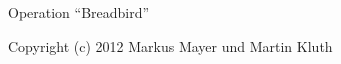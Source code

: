 
\begin{titlepage}

	\vspace*{7cm}
	\begin{center}

		\Huge
		Operation \enquote{Breadbird} \\
		\vspace{2cm}
	\end{center}
	\normalsize
	\vfill
	Copyright (c) 2012 Markus Mayer und Martin Kluth
	
\end{titlepage}




